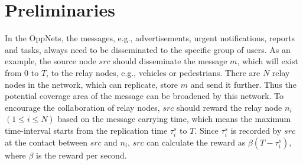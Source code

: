 \section{Preliminaries}
\label{sec:preli}
In the OppNets,
the messages, e.g., advertisements, urgent notifications,
reports and tasks,
always need to be disseminated
to the specific group of users.
As an example, the source node $src$
should disseminate the message $m$,
which will exist from $0$ to $T$,
to the relay nodes,
e.g., vehicles or pedestrians.
There are $N$ relay nodes in the network,
which can replicate, store $m$ and send it further.
Thus the potential coverage area of the message
can be broadened by this network.
To encourage the collaboration of relay nodes,
$src$ should reward the relay node $n_{i}$
$(1 \le i \le N)$ based on the message carrying time,
which means the maximum time-interval
starts from the replication time $\tau_{i}^{s}$
to $T$.
Since $\tau_{i}^{s}$ is recorded by $src$
at the contact between $src$ and $n_{i}$,
$src$ can calculate the reward
as $\beta (T-\tau_{i}^{s})$, where $\beta$ is the reward per second.

